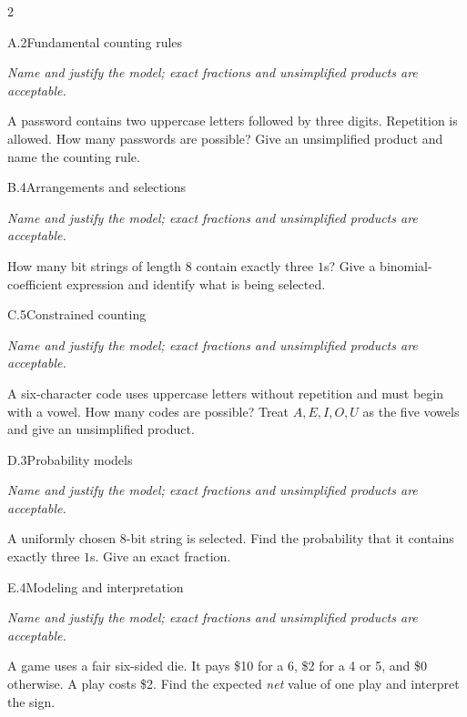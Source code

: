 \documentclass[9pt]{extarticle}
\begin{document}
\begin{multicols}{2}
\begin{CoreProblem}{A.2}{Fundamental counting rules}
{\scriptsize\textit{Name and justify the model; exact fractions and unsimplified products are acceptable.}\par}
A password contains two uppercase letters followed by three digits.
    Repetition is allowed. How many passwords are possible? Give an unsimplified
    product and name the counting rule.
\end{CoreProblem}
\begin{CoreProblem}{B.4}{Arrangements and selections}
{\scriptsize\textit{Name and justify the model; exact fractions and unsimplified products are acceptable.}\par}
How many bit strings of length 8 contain exactly three $1$s? Give a
    binomial-coefficient expression and identify what is being selected.
\end{CoreProblem}
\begin{CoreProblem}{C.5}{Constrained counting}
{\scriptsize\textit{Name and justify the model; exact fractions and unsimplified products are acceptable.}\par}
A six-character code uses uppercase letters without repetition and
    must begin with a vowel. How many codes are possible? Treat
    $A,E,I,O,U$ as the five vowels and give an unsimplified product.
\end{CoreProblem}
\columnbreak
\begin{CoreProblem}{D.3}{Probability models}
{\scriptsize\textit{Name and justify the model; exact fractions and unsimplified products are acceptable.}\par}
A uniformly chosen 8-bit string is selected. Find the probability
    that it contains exactly three $1$s. Give an exact fraction.
\end{CoreProblem}
\begin{CoreProblem}{E.4}{Modeling and interpretation}
{\scriptsize\textit{Name and justify the model; exact fractions and unsimplified products are acceptable.}\par}
A game uses a fair six-sided die. It pays \$10 for a 6, \$2 for a 4
    or 5, and \$0 otherwise. A play costs \$2. Find the expected \emph{net}
    value of one play and interpret the sign.
\end{CoreProblem}
\end{multicols}
\CoreWorkArea
\FormBreak
{}
\end{document}
